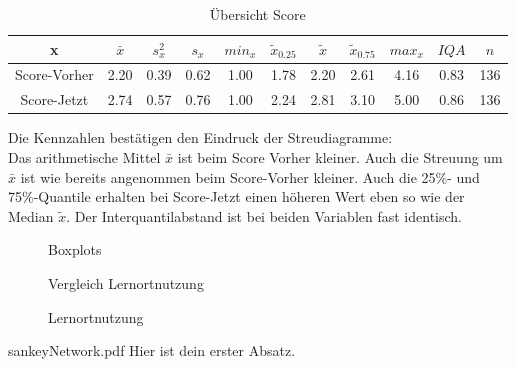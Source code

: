 \documentclass[11pt, a4paper]{article}
\begin{document}
\begin{table}[htb]
	\vspace{-1.5cm}
	\centering
	\begin{tabular}{c|ccccccccc|c}
		x & $\bar{x}$ & $s_x^2$ & $s_x$ & $min_x$ & $\tilde{x}_{0.25}$ & $\tilde{x}$ & $\tilde{x}_{0.75}$ & $max_x$ & $IQA$ & $n$ \\ \hline
		Score-Vorher & 2.20 & 0.39 & 0.62 & 1.00 & 1.78 & 2.20 & 2.61 & 4.16 & 0.83 & 136 \\
		Score-Jetzt & 2.74 & 0.57 & 0.76 & 1.00 & 2.24 & 2.81 & 3.10 & 5.00 & 0.86 & 136
	\end{tabular}
	\caption{Übersicht Score}
\end{table}
	Die Kennzahlen bestätigen den Eindruck der Streudiagramme:\\
Das arithmetische Mittel $\bar{x}$ ist beim Score Vorher kleiner.
Auch die Streuung um $\bar{x}$ ist wie bereits angenommen beim Score-Vorher kleiner. Auch die 25\%- und 75\%-Quantile erhalten bei Score-Jetzt einen höheren Wert eben so wie der Median $\tilde{x}$.
Der Interquantilabstand ist bei beiden Variablen fast identisch.


\leavevmode
\newpage

\begin{figure}
	\vspace{-1.5cm}
	\centering 
	\vspace{-1cm}
	\caption{Boxplots}
\end{figure}


\leavevmode


\begin{figure}
	\vspace{-1.5cm}
	\centering 
	\vspace{-0.5cm}
	\caption{Vergleich Lernortnutzung}
\end{figure}

\begin{figure}
	\vspace{-1.5cm}
	\centering 
	\vspace{-1cm}
	\caption{Lernortnutzung}
\end{figure}

 {sankeyNetwork.pdf}
Hier ist dein erster Absatz.
\end{document}
